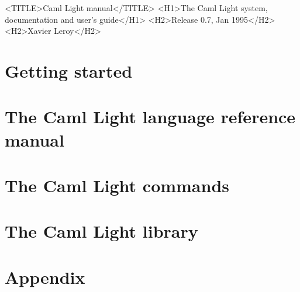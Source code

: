\begin{rawhtml}
  <TITLE>Caml Light manual</TITLE>
  <H1>The Caml Light system, documentation and user's guide</H1>
  <H2>Release 0.7, Jan 1995</H2>
  <H2>Xavier Leroy</H2>
\end{rawhtml}



\part{Getting started} \label{p:gettingstarted}


\part{The Caml Light language reference manual} \label{p:refman}



\part{The Caml Light commands} \label{p:commands}







\part{The Caml Light library} \label{p:library}







\part{Appendix} \label{p:appendix}

